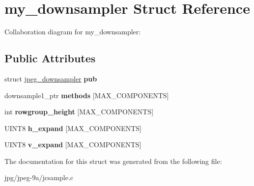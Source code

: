 \hypertarget{structmy__downsampler}{\section{my\+\_\+downsampler Struct Reference}
\label{structmy__downsampler}
}


Collaboration diagram for my\+\_\+downsampler\+:
\subsection*{Public Attributes}
\begin{DoxyCompactItemize}
\item 
\hypertarget{structmy__downsampler_a3ace227dd4fd9fdf8e8fe542ca6503c3}{struct \hyperlink{structjpeg__downsampler}{jpeg\+\_\+downsampler} {\bfseries pub}}\label{structmy__downsampler_a3ace227dd4fd9fdf8e8fe542ca6503c3}

\item 
\hypertarget{structmy__downsampler_a6e74bc63d21fbd97d92dc36f65011a75}{downsample1\+\_\+ptr {\bfseries methods} \mbox{[}M\+A\+X\+\_\+\+C\+O\+M\+P\+O\+N\+E\+N\+T\+S\mbox{]}}\label{structmy__downsampler_a6e74bc63d21fbd97d92dc36f65011a75}

\item 
\hypertarget{structmy__downsampler_a60c30dd6034e706ee9d21d0f5f198af7}{int {\bfseries rowgroup\+\_\+height} \mbox{[}M\+A\+X\+\_\+\+C\+O\+M\+P\+O\+N\+E\+N\+T\+S\mbox{]}}\label{structmy__downsampler_a60c30dd6034e706ee9d21d0f5f198af7}

\item 
\hypertarget{structmy__downsampler_a051e236dc44201165b1625621994b86c}{U\+I\+N\+T8 {\bfseries h\+\_\+expand} \mbox{[}M\+A\+X\+\_\+\+C\+O\+M\+P\+O\+N\+E\+N\+T\+S\mbox{]}}\label{structmy__downsampler_a051e236dc44201165b1625621994b86c}

\item 
\hypertarget{structmy__downsampler_ab3bc55e23e197c2129ae09c82fb62e83}{U\+I\+N\+T8 {\bfseries v\+\_\+expand} \mbox{[}M\+A\+X\+\_\+\+C\+O\+M\+P\+O\+N\+E\+N\+T\+S\mbox{]}}\label{structmy__downsampler_ab3bc55e23e197c2129ae09c82fb62e83}

\end{DoxyCompactItemize}


The documentation for this struct was generated from the following file\+:\begin{DoxyCompactItemize}
\item 
jpg/jpeg-\/9a/jcsample.\+c\end{DoxyCompactItemize}
